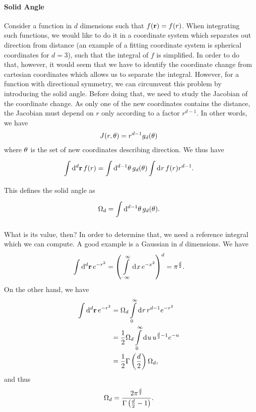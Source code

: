 \paragraph{Solid Angle}
Consider a function in $d$ dimensions such that $f(\vb{r}) = f(r)$. When integrating such functions, we would like to do it in a coordinate system which separates out direction from distance (an example of a fitting coordinate system is spherical coordinates for $d = 3$), such that the integral of $f$ is simplified. In order to do that, however, it would seem that we have to identify the coordinate change from cartesian coordinates which allows us to separate the integral. However, for a function with directional symmetry, we can circumvent this problem by introducing the solid angle. Before doing that, we need to study the Jacobian of the coordinate change. As only one of the new coordinates contains the distance, the Jacobian must depend on $r$ only according to a factor $r^{d - 1}$. In other words, we have
\begin{align*}
	J(r, \vb{\theta}) = r^{d - 1}g_{d}(\vb{\theta})
\end{align*}
where $\vb{\theta}$ is the set of new coordinates describing direction. We thus have
\begin{align*}
	\int\limits_{}^{}\dd[d]{\vb{r}}f(r) = \int\limits_{}^{}\dd[d - 1]{\vb{\theta}}g_{d}(\vb{\theta})\int\limits_{}^{}\dd[]{r}f(r)r^{d - 1}.
\end{align*}
This defines the solid angle as
\begin{align*}
	\Omega_{d} = \int\limits_{}^{}\dd[d - 1]{\vb{\theta}}g_{d}(\vb{\theta}).
\end{align*}

What is its value, then? In order to determine that, we need a reference integral which we can compute. A good example is a Gaussian in $d$ dimensions. We have
\begin{align*}
	\int\limits_{}^{}\dd[d]{\vb{r}}e^{-r^{2}} = \left(\int\limits_{-\infty}^{\infty}\dd[]{x}e^{-x^{2}}\right)^{d} = \pi^{\frac{d}{2}}.
\end{align*}
On the other hand, we have
\begin{align*}
	\int\limits_{}^{}\dd[d]{\vb{r}}e^{-r^{2}} &= \Omega_{d}\int\limits_{0}^{\infty}\dd[]{r}r^{d - 1}e^{-r^{2}} \\
                                      &= \frac{1}{2}\Omega_{d}\int\limits_{0}^{\infty}\dd[]{u}u^{\frac{d}{2} - 1}e^{-u} \\
                                      &= \frac{1}{2}\Gamma\left(\frac{d}{2}\right)\Omega_{d},
\end{align*}
and thus
\begin{align*}
	\Omega_{d} = \frac{2\pi^{\frac{d}{2}}}{\Gamma\left(\frac{d}{2} - 1\right)}.
\end{align*}